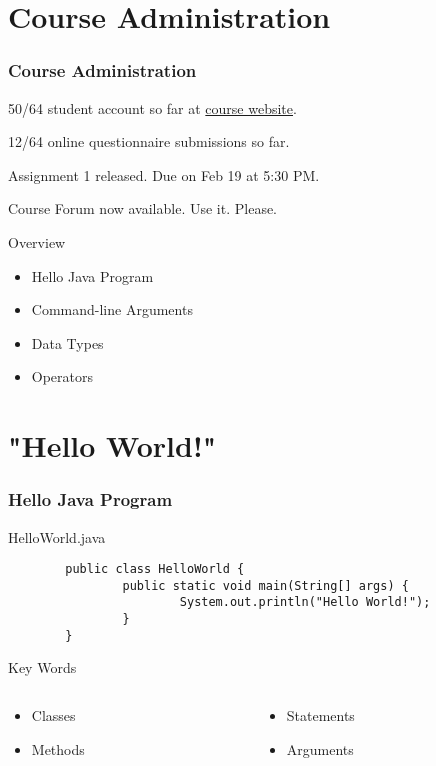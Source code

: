 \documentclass[10pt, compress]{beamer}
\begin{document}
\prepareCover

\section{Course Administration}

\begin{frame}[fragile]
\frametitle{Course Administration}
	50/64 student account so far at \href{http://ghorbanzade.com/}{course website}.

	12/64 online questionnaire submissions so far.

	Assignment 1 released. Due on Feb 19 at 5:30 PM.

	Course Forum now available. Use it. Please.
\end{frame}

\begin{frame}{Overview}
	\begin{itemize}
		\item[] Hello Java Program
		\item[] Command-line Arguments
		\item[] Data Types
		\item[] Operators
	\end{itemize}
\end{frame}

\section{"Hello World!"}

\begin{frame}[fragile]
	\frametitle{Hello Java Program}
	\begin{block}{HelloWorld.java}
		\begin{verbatim}
		public class HelloWorld {
				public static void main(String[] args) {
						System.out.println("Hello World!");
				}
		}
		\end{verbatim}
	\end{block}
	\begin{block}{Key Words}
		\begin{columns}
		\begin{column}{0.5\textwidth}
			\begin{itemize}
				\item[] Classes
				\item[] Methods
			\end{itemize}
		\end{column}
		\begin{column}{0.5\textwidth}
			\begin{itemize}
				\item[] Statements
				\item[] Arguments
			\end{itemize}
		\end{column}
		\end{columns}
	\end{block}
\end{frame}
\end{document}
